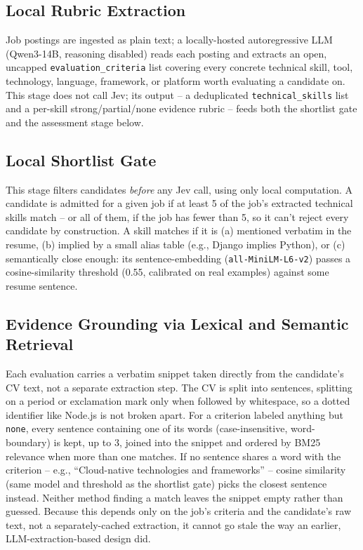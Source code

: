 \documentclass[journal]{IEEEtran}
\begin{document}
\subsection{Local Rubric Extraction}
Job postings are ingested as plain text; a locally-hosted autoregressive LLM (Qwen3-14B, reasoning disabled) reads each posting and extracts an open, uncapped \texttt{evaluation\_criteria} list covering every concrete technical skill, tool, technology, language, framework, or platform worth evaluating a candidate on. This stage does not call Jev; its output -- a deduplicated \texttt{technical\_skills} list and a per-skill strong/partial/none evidence rubric -- feeds both the shortlist gate and the assessment stage below.

\subsection{Local Shortlist Gate}
This stage filters candidates \emph{before} any Jev call, using only local computation. A candidate is admitted for a given job if at least 5 of the job's extracted technical skills match -- or all of them, if the job has fewer than 5, so it can't reject every candidate by construction. A skill matches if it is (a) mentioned verbatim in the resume, (b) implied by a small alias table (e.g., Django implies Python), or (c) semantically close enough: its sentence-embedding (\texttt{all-MiniLM-L6-v2}) passes a cosine-similarity threshold (0.55, calibrated on real examples) against some resume sentence.

\subsection{Evidence Grounding via Lexical and Semantic Retrieval}
Each evaluation carries a verbatim snippet taken directly from the candidate's CV text, not a separate extraction step. The CV is split into sentences, splitting on a period or exclamation mark only when followed by whitespace, so a dotted identifier like Node.js is not broken apart. For a criterion labeled anything but \texttt{none}, every sentence containing one of its words (case-insensitive, word-boundary) is kept, up to 3, joined into the snippet and ordered by BM25 relevance when more than one matches. If no sentence shares a word with the criterion -- e.g., ``Cloud-native technologies and frameworks'' -- cosine similarity (same model and threshold as the shortlist gate) picks the closest sentence instead. Neither method finding a match leaves the snippet empty rather than guessed. Because this depends only on the job's criteria and the candidate's raw text, not a separately-cached extraction, it cannot go stale the way an earlier, LLM-extraction-based design did.
\end{document}
